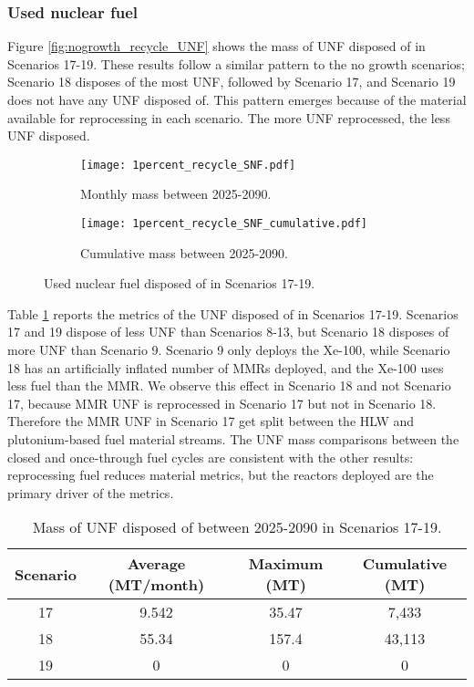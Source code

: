 \subsubsection{Used nuclear fuel}
Figure \ref{fig:nogrowth_recycle_UNF} shows the mass of \gls{UNF} 
disposed of in Scenarios 17-19. These results follow a similar 
pattern to the no growth scenarios; Scenario 18 disposes of 
the most \gls{UNF}, followed by Scenario 17, and Scenario 
19 does not have any \gls{UNF} disposed of. This pattern 
emerges because of the material available for reprocessing 
in each scenario. The more \gls{UNF} reprocessed, the less 
\gls{UNF} disposed. 

\begin{figure}[h!]
    \centering
    \begin{subfigure}[b]{0.49\textwidth}
        \centering
        \texttt{[image: 1percent\_recycle\_SNF.pdf]}
        \caption{Monthly mass between 2025-2090.}
        \label{fig:1percent_recycle_UNF_all}
    \end{subfigure}
    \hfill
    \begin{subfigure}[b]{0.49\textwidth}
        \centering
        \texttt{[image: 1percent\_recycle\_SNF\_cumulative.pdf]}
        \caption{Cumulative mass between 2025-2090.}
        \label{fig:1percent_recycle_UNF_cumulative}
    \end{subfigure}
       \caption{Used nuclear fuel disposed of in Scenarios 17-19.}
       \label{fig:1percent_recycle_UNF}
\end{figure}

Table \ref{tab:s17-19_UNF} reports the metrics of the \gls{UNF} 
disposed of in Scenarios 17-19. Scenarios 17 and 19 dispose of 
less \gls{UNF} than Scenarios 8-13, but Scenario 18 disposes of 
more \gls{UNF} than Scenario 9. Scenario 9 only deploys the 
Xe-100, while Scenario 18 has an artificially inflated number of 
\glspl{MMR} deployed, and the Xe-100 uses less fuel than the 
\gls{MMR}. We observe this effect in Scenario 18 and not 
Scenario 17, because \gls{MMR} \gls{UNF} is reprocessed in 
Scenario 17 but not in Scenario 18. Therefore the \gls{MMR} 
\gls{UNF} in Scenario 17 get split between the 
\gls{HLW} and plutonium-based fuel material streams. The \gls{UNF} mass comparisons 
between the closed and once-through fuel cycles are consistent 
with the other results: reprocessing fuel reduces material metrics, 
but the reactors deployed are the primary driver of the metrics. 

\begin{table}[h!]
    \centering 
    \caption{Mass of UNF disposed of between 2025-2090 in 
    Scenarios 17-19.}
    \label{tab:s17-19_UNF}
    \begin{tabular}{c c c c}
        \hline 
        Scenario & Average (MT/month) & Maximum (MT) & Cumulative (MT) \\
        \hline
        17 & 9.542 & 35.47 & 7,433\\
        18 & 55.34 & 157.4 & 43,113\\
        19 & 0 & 0 & 0 \\
        \hline
    \end{tabular}
\end{table}


